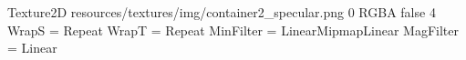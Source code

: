 Texture2D
resources/textures/img/container2_specular.png
0
RGBA
false
4
WrapS = Repeat
WrapT = Repeat
MinFilter = LinearMipmapLinear
MagFilter = Linear